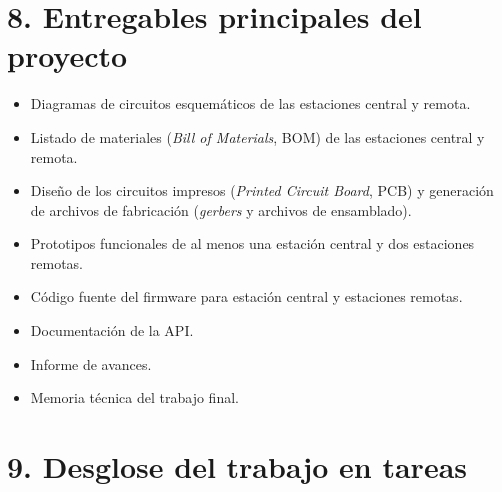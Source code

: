 \documentclass[
11pt, %
]{charter}
\begin{document}
\section{8. Entregables principales del proyecto}
\label{sec:entregables}

\begin{itemize}
	\item Diagramas de circuitos esquemáticos de las estaciones central y remota.
	\item Listado de materiales (\textit{Bill of Materials}, BOM) de las estaciones central y remota.
	\item Diseño de los circuitos impresos (\textit{Printed Circuit Board}, PCB) y generación de archivos de fabricación (\textit{gerbers} y archivos de ensamblado).
	\item Prototipos funcionales de al menos una estación central y dos estaciones remotas.
	\item Código fuente del firmware para estación central y estaciones remotas.
	\item Documentación de la API.
	\item Informe de avances.
	\item Memoria técnica del trabajo final.
\end{itemize}

\section{9. Desglose del trabajo en tareas}
\label{sec:wbs}
\end{document}
